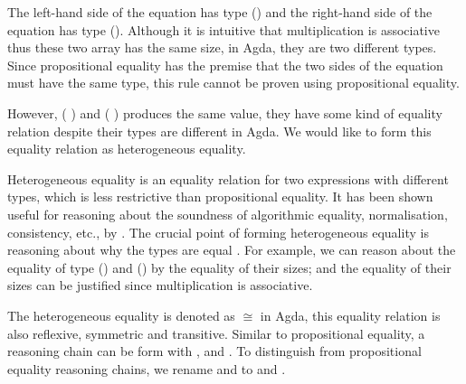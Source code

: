 \documentclass{l4proj}
\begin{document}
The left-hand side of the equation has type (\AgdaSpace{}\AgdaSpace{}\AgdaSymbol{(}\AgdaSpace{}\AgdaOperator{\AgdaPrimitive{*}}\AgdaSpace{}\AgdaSpace{}\AgdaOperator{\AgdaPrimitive{*}}\AgdaSpace{}\AgdaSymbol{)}) and the right-hand side of the equation has type (\AgdaSpace{}\AgdaSpace{}\AgdaSymbol{(}\AgdaSpace{}\AgdaOperator{\AgdaPrimitive{*}}\AgdaSpace{}\AgdaSymbol{(}\AgdaSpace{}\AgdaOperator{\AgdaPrimitive{*}}\AgdaSpace{}\AgdaSymbol{))}). Although it is intuitive that multiplication is associative thus these two array has the same size, in Agda, they are two different types. Since propositional equality has the premise that the two sides of the equation must have the same type, this rule cannot be proven using propositional equality.

However, (\AgdaSpace{}%
\AgdaSymbol{(}\AgdaSpace{}%
\AgdaSymbol{)}) and (\AgdaSpace{}%
\AgdaSymbol{(}\AgdaSpace{}%
\AgdaSpace{}%
\AgdaSymbol{)}) produces the same value, they have some kind of equality relation despite their types are different in Agda. We would like to form this equality relation as heterogeneous equality.

Heterogeneous equality is an equality relation for two expressions with different types, which is less restrictive than propositional equality. It has been shown useful for reasoning about the soundness of algorithmic equality, normalisation, consistency, etc., by \cite{abel2011irrelevance}. The crucial point of forming heterogeneous equality is reasoning about why the types are equal \citep{altenkirch2007observational}. For example, we can reason about the equality of type (\AgdaSpace{}\AgdaSpace{}\AgdaSymbol{(}\AgdaSpace{}\AgdaOperator{\AgdaPrimitive{*}}\AgdaSpace{}\AgdaSpace{}\AgdaOperator{\AgdaPrimitive{*}}\AgdaSpace{}\AgdaSymbol{)}) and (\AgdaSpace{}\AgdaSpace{}\AgdaSymbol{(}\AgdaSpace{}\AgdaOperator{\AgdaPrimitive{*}}\AgdaSpace{}\AgdaSymbol{(}\AgdaSpace{}\AgdaOperator{\AgdaPrimitive{*}}\AgdaSpace{}\AgdaSymbol{))}) by the equality of their sizes; and the equality of their sizes can be justified since multiplication is associative.

The heterogeneous equality is denoted as $\cong$ in Agda, this equality relation is also reflexive, symmetric and transitive. Similar to propositional equality, a reasoning chain can be form with ,  and . To distinguish from propositional equality reasoning chains, we rename  and   to  and  .
\end{document}
